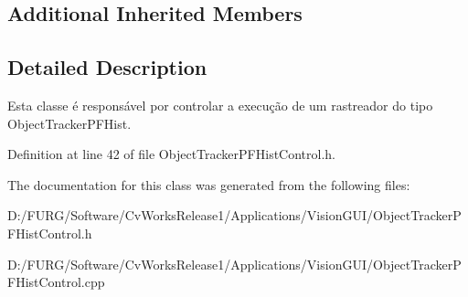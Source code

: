 \subsection*{Additional Inherited Members}


\subsection{Detailed Description}
Esta classe é responsável por controlar a execução de um rastreador do tipo Object\+Tracker\+P\+F\+Hist. 

Definition at line 42 of file Object\+Tracker\+P\+F\+Hist\+Control.\+h.



The documentation for this class was generated from the following files\+:\begin{DoxyCompactItemize}
\item 
D\+:/\+F\+U\+R\+G/\+Software/\+Cv\+Works\+Release1/\+Applications/\+Vision\+G\+U\+I/Object\+Tracker\+P\+F\+Hist\+Control.\+h\item 
D\+:/\+F\+U\+R\+G/\+Software/\+Cv\+Works\+Release1/\+Applications/\+Vision\+G\+U\+I/Object\+Tracker\+P\+F\+Hist\+Control.\+cpp\end{DoxyCompactItemize}
